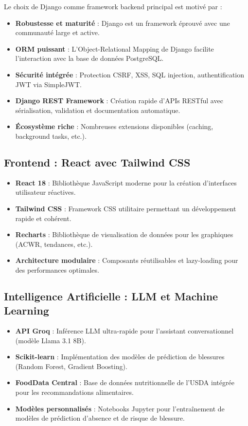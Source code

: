 Le choix de Django comme framework backend principal est motivé par :

\begin{itemize}
    \item \textbf{Robustesse et maturité} : Django est un framework éprouvé avec une communauté large et active.
    \item \textbf{ORM puissant} : L'Object-Relational Mapping de Django facilite l'interaction avec la base de données PostgreSQL.
    \item \textbf{Sécurité intégrée} : Protection CSRF, XSS, SQL injection, authentification JWT via SimpleJWT.
    \item \textbf{Django REST Framework} : Création rapide d'APIs RESTful avec sérialisation, validation et documentation automatique.
    \item \textbf{Écosystème riche} : Nombreuses extensions disponibles (caching, background tasks, etc.).
\end{itemize}

\subsection{Frontend : React avec Tailwind CSS}

\begin{itemize}
    \item \textbf{React 18} : Bibliothèque JavaScript moderne pour la création d'interfaces utilisateur réactives.
    \item \textbf{Tailwind CSS} : Framework CSS utilitaire permettant un développement rapide et cohérent.
    \item \textbf{Recharts} : Bibliothèque de visualisation de données pour les graphiques (ACWR, tendances, etc.).
    \item \textbf{Architecture modulaire} : Composants réutilisables et lazy-loading pour des performances optimales.
\end{itemize}

\subsection{Intelligence Artificielle : LLM et Machine Learning}

\begin{itemize}
    \item \textbf{API Groq} : Inférence LLM ultra-rapide pour l'assistant conversationnel (modèle Llama 3.1 8B).
    \item \textbf{Scikit-learn} : Implémentation des modèles de prédiction de blessures (Random Forest, Gradient Boosting).
    \item \textbf{FoodData Central} : Base de données nutritionnelle de l'USDA intégrée pour les recommandations alimentaires.
    \item \textbf{Modèles personnalisés} : Notebooks Jupyter pour l'entraînement de modèles de prédiction d'absence et de risque de blessure.
\end{itemize}

